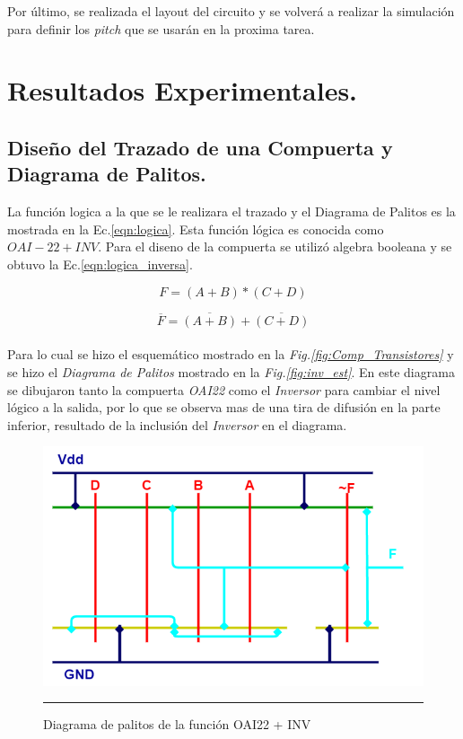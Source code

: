 \documentclass[12pt,a4paper]{article} %
\begin{document}
Por último, se realizada el layout del circuito y se volverá a realizar la simulación para definir los \textit{pitch} que se usarán en la proxima tarea.

\section{Resultados Experimentales.}


\subsection{Diseño del Trazado de una Compuerta y Diagrama de Palitos.}


La función logica a la que se le realizara el trazado y el Diagrama de Palitos es la mostrada en la Ec.\ref{eqn:logica}. Esta función lógica es conocida como $OAI-22 + INV.$ Para el diseno de la compuerta se utilizó algebra booleana y se obtuvo la Ec.\ref{eqn:logica_inversa}.

\begin{equation}\label{eqn:logica}
F=(A+B)*(C+D)
\end{equation}

\begin{equation}\label{eqn:logica_inversa}
\overline{F}=\overline{(A+B)}+\overline{(C+D)}
\end{equation}\\


Para lo cual se hizo el esquemático mostrado en la \textit{Fig.\ref{fig:Comp_Transistores}} y se hizo el \textit{Diagrama de Palitos} mostrado en la \textit{Fig.\ref{fig:inv_est}}. En este diagrama se dibujaron tanto la compuerta \textit{OAI22} como el \textit{Inversor} para cambiar el nivel lógico a la salida, por lo que se observa mas de una tira de difusión en la parte inferior, resultado de la inclusión del \textit{Inversor} en el diagrama.\\

\begin{figure}[htbp]
  \centering
    \includegraphics[scale=0.4]{./Palitos.png}
    \rule{35em}{0.5pt}
  \caption[IdealvsSim]{Diagrama de palitos de la función OAI22 + INV}
  \label{fig:pal}
\end{figure}
\end{document}
